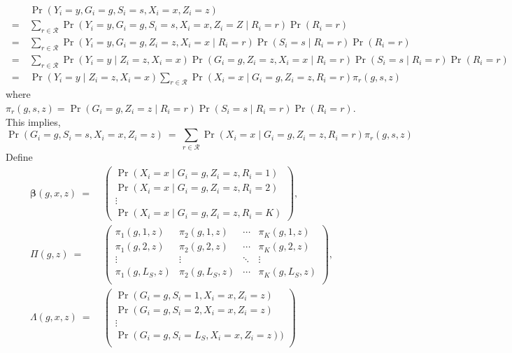 \documentclass[11pt]{article}
\theoremstyle{plain}
\newcommand{\cR}{\mathcal{R}}
\newcommand{\bbeta}{\bm{\beta}}
\begin{document}
\begin{align*}
  & \Pr(Y_i = y, G_i = g, S_i = s, X_i = x, Z_i = z) \\
  \ = \ &  \sum_{r \in \cR} \Pr(Y_i = y, G_i = g, S_i = s, X_i = x, Z_i = Z\mid
          R_i = r) \Pr(R_i = r) \\
  \ = \ &  \sum_{r \in \cR} \Pr(Y_i = y, G_i = g, Z_i = z, X_i = x \mid
          R_i = r) \Pr(S_i = s \mid R_i = r)\Pr(R_i = r) \\
  \ = \ &  \sum_{r \in \cR} \Pr(Y_i = y \mid Z_i = z, X_i = x) \Pr(G_i
          = g, Z_i = z, X_i = x \mid R_i = r)\Pr(S_i = s \mid R_i = r)\Pr(R_i = r) \\
  \ = \ &  \Pr(Y_i = y \mid Z_i = z, X_i = x) \sum_{r \in \cR} \Pr(X_i
           = x \mid G_i = g, Z_i = z, R_i = r)\pi_r(g,s,z)
\end{align*}
where
$\pi_r(g,s,z) = \Pr(G_i = g, Z_i = z \mid R_i = r)\Pr(S_i = s \mid R_i
= r)\Pr(R_i = r)$.  This implies,
\begin{equation*}
  \Pr(G_i = g, S_i = s, X_i = x, Z_i = z) \ = \ \sum_{r \in \cR} \Pr(X_i
  = x \mid G_i = g, Z_i = z, R_i = r)\pi_r(g,s,z)
\end{equation*}
Define
\begin{align}
  \bbeta(g,x,z) \ = & \ \begin{pmatrix}
    \Pr(X_i = x \mid G_i = g, Z_i = z, R_i = 1) \\
    \Pr(X_i = x \mid G_i = g, Z_i = z, R_i = 2) \\
    \vdots \\
    \Pr(X_i = x \mid G_i = g, Z_i = z, R_i = K)
  \end{pmatrix},
  \\
  \Pi(g,z) \ =  & \ \begin{pmatrix}
    \pi_1(g,1,z) & \pi_2(g,1,z) & \cdots & \pi_K(g,1,z) \\
    \pi_1(g,2,z) & \pi_2(g,2,z) & \cdots & \pi_K(g,2,z) \\
    \vdots & \vdots & \ddots & \vdots \\
    \pi_1(g,L_S,z) & \pi_2(g,L_S,z) & \cdots & \pi_K(g,L_S,z) \\
  \end{pmatrix},
  \\
  \Lambda(g,x,z) \ = & \ \begin{pmatrix}
    \Pr(G_i = g, S_i = 1, X_i = x, Z_i = z) \\
    \Pr(G_i = g, S_i = 2, X_i = x, Z_i = z) \\
    \vdots \\
   \Pr(G_i = g, S_i = L_S, X_i = x, Z_i = z) ) \\
  \end{pmatrix}
\end{align}
\end{document}
